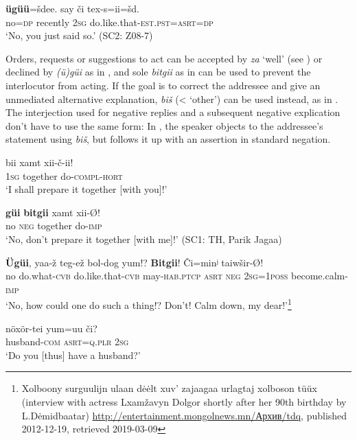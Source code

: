 \documentclass[output=paper,colorlinks,citecolor=brown,chinesefont]{langscibook}
\begin{document}
    \ex\label{ex:kha:50b} 
        \gll \textbf{ügüü}=šdee. say či tex-s=ii=šd. \\
             no=\textsc{dp} recently \textsc{2sg} do.like.that-\textsc{est.pst=asrt=dp} \\ 
        \glt ‘No, you just said so.’ (SC2: Z08-7)
    \z
\z 

Orders, requests or suggestions to act can be accepted by \textit{za} ‘well’ (see \citealt{Purev-Ocir2009}) or declined by \textit{(ü)güi} as in , and sole \textit{bitgii} as in  can be used to prevent the interlocutor from acting. If the goal is to correct the addressee and give an unmediated alternative explanation, \textit{biš} (< ‘other’) can be used instead, as in . The interjection used for negative replies and a subsequent negative explication don’t have to use the same form: In , the speaker objects to the addressee’s statement using \textit{biš}, but follows it up with an assertion in standard negation.

\ea\label{ex:kha:51}
    \ea\label{ex:kha:51A}
        \gll bii xamt xii-č-ii! \\ 
             \textsc{1sg} together do-\textsc{compl}{}-\textsc{hort} \\
        \glt ‘I shall prepare it together [with you]!’
    
    \ex\label{ex:kha:51B}
        \gll \textbf{güi} \textbf{bitgii} xamt xii-Ø! \\
             no \textsc{neg} together do-\textsc{imp} \\
        \glt ‘No, don’t prepare it together [with me]!’ (SC1: TH, Parik Jagaa)
    \z
\z 

\ea\label{ex:kha:52}
    \gll \textbf{Ügüi}, yaa-ž teg-ež bol-dog yum!? \textbf{Bitgii}! Či=minʲ taiwšir-Ø! \\
         no do.what-\textsc{cvb} do.like.that-\textsc{cvb}  may-\textsc{hab.ptcp} \textsc{asrt} \textsc{neg} \textsc{2sg=1poss} become.calm-\textsc{imp}\\ 
    \glt ‘No, how could one do such a thing!? Don’t! Calm down, my dear!’\footnote{Xolboony surguulijn ulaan d\.e\.elt xuv’ zajaagaa urlagtaj xolboson tüüx (interview with actress Lxamžavyn Dolgor shortly after her 90th birthday by L.D\.emidbaatar) \url{http://entertainment.mongolnews.mn/Архив/tdq}, published 2012-12-19, retrieved 2019-03-09}
\z 

\ea\label{ex:kha:53}
    \ea\label{ex:kha:53Aa}
        \gll nöxör-tei yum=uu   či? \\ 
             husband-\textsc{com} \textsc{asrt=q.plr} \textsc{2sg} \\
        \glt ‘Do you [thus] have a husband?’
    
\end{document}
